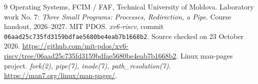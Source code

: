 \begin{thebibliography}{9}
 Operating Systems, FCIM / FAF, Technical University of Moldova.
Laboratory work No. 7: \emph{Three Small Programs: Processes, Redirection, a Pipe}. Course handout, 2026--2027.
 MIT PDOS. \emph{xv6-riscv}, commit
\texttt{06aad25c735fd3159bdfae5680be4eab7b1668b2}.
Source checked on 23 October 2026.
\url{https://github.com/mit-pdos/xv6-riscv/tree/06aad25c735fd3159bdfae5680be4eab7b1668b2}.
 Linux man-pages project. \emph{fork(2), pipe(7), inode(7), path\_resolution(7)}.
\url{https://man7.org/linux/man-pages/}.
\end{thebibliography}
